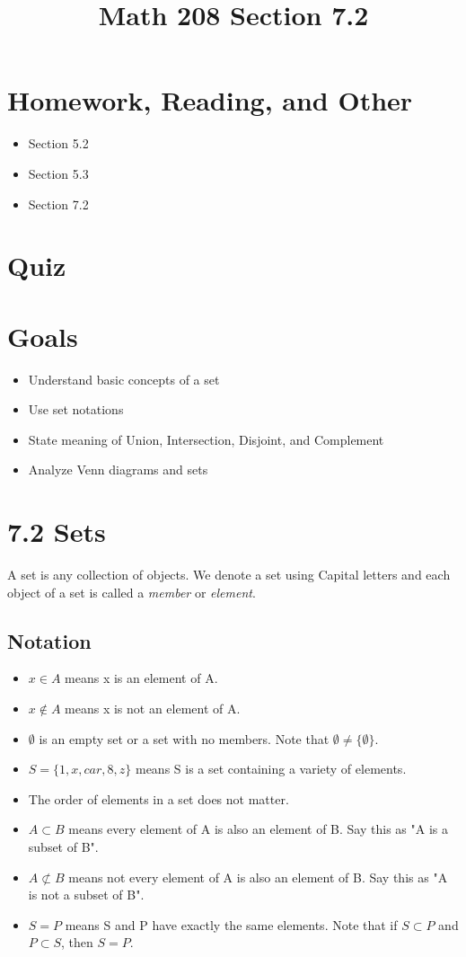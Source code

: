 \documentclass[14pt]{extarticle}
\title{\vspace{-5ex}Math 208 Section 7.2}
\date{\vspace{-10ex}}
\begin{document}
\maketitle		
\section*{Homework, Reading, and Other}
\begin{itemize}
	\item Section 5.2
	\item Section 5.3
	\item Section 7.2
\end{itemize}

\section*{Quiz}

\section*{Goals}
\begin{itemize}
	\item Understand basic concepts of a set
	\item Use set notations
	\item State meaning of Union, Intersection, Disjoint, and Complement
	\item Analyze Venn diagrams and sets
\end{itemize}

\section*{7.2 Sets}
A set is any collection of objects. We denote a set using Capital letters and each object of a set is called a \textit{member} or \textit{element}.

\subsection{Notation}
\begin{itemize}
	\item $x \in A$ means x is an element of A.
	\item $x \notin A$ means x is not an element of A.
	\item $\emptyset$ is an empty set or a set with no members. Note that $\emptyset \neq \{\emptyset\}$.
	\item $S = \{1,x,car,8,z\}$ means S is a set containing a variety of elements.
	\item The order of elements in a set does not matter.
	\item $A \subset B$ means every element of A is also an element of B. Say this as "A is a subset of B". 
	\item $A \not\subset B$ means not every element of A is also an element of B. Say this as "A is not a subset of B".
	\item $S = P$ means S and P have exactly the same elements. Note that if $S \subset P$ and $P \subset S$, then $S = P$.
\end{itemize}
	
\end{document}
